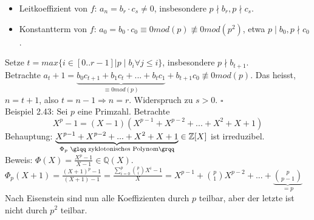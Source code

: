 \documentclass[10pt,a4paper]{article}
\begin{document}
\begin{itemize}
 \item Leitkoeffizient von $f$: $a_n = b_r \cdot c_s \neq 0$, insbesondere $p \nmid b_r, p \nmid c_s$.
 \item Konstantterm von $f$: $a_0 = b_0 \cdot c_0 \equiv 0 mod (p) \not\equiv 0 mod (p^2)$, etwa $p \mid b_0, p \nmid c_0$.
\end{itemize}
Setze $t = max \lbrace i \in [0..r-1] | p \mid b_i \forall j \le i \rbrace$, insbesondere $p \nmid b_{t+1}$.\\
Betrachte $a_t+1 = \underbrace{b_0 c_{t+1} + b_1 c_t + ... + b_t c_1}_{\equiv 0 mod (p)} + b_{t+1} c_0 \not\equiv 0 mod (p)$. Das heisst, $n = t+1$, also $t = n-1 \Rightarrow n = r$. Widerspruch zu $s > 0$.
$\square$\\

Beispiel 2.43: Sei $p$ eine Primzahl. Betrachte
$$X^p - 1 = (X-1) (X^{p-1} + X^{p-2} + ... + X^2 + X + 1)$$
Behauptung: $\underbrace{X^{p-1} + X^{p-2} + ... + X^2 + X + 1}_{\Phi_p\textrm{ \glqq zyklotonisches Polynom\grqq}} \in \mathbb{Z}[X]$ ist irreduzibel.\\
Beweis: $\Phi(X) = \frac{X^p - 1}{X-1} \in \mathbb{Q}(X)$. $\Phi_p(X+1) = \frac{(X+1)^p - 1}{(X+1)-1} = \frac{\sum_{i=0}^p \binom{p}{i} X^i - 1}{X} = X^{p-1} + \binom{p}{1} X^{p-2} + ... + \underbrace{\binom{p}{p-1}}_{=p}$\\
Nach Eisenstein sind nun alle Koeffizienten durch $p$ teilbar, aber der letzte ist nicht durch $p^2$ teilbar.
\end{document}
